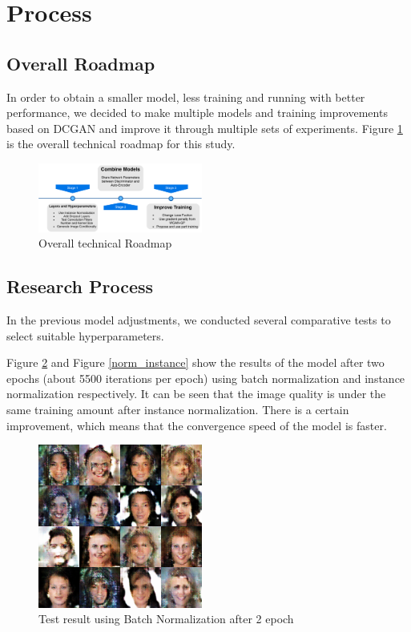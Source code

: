 \section{Process}
\subsection{Overall Roadmap}

In order to obtain a smaller model, less training and running with better performance, we decided to make multiple models and training improvements based on DCGAN and improve it through multiple sets of experiments.
Figure \ref{roadmap} is the overall technical roadmap for this study.

\begin{figure}
    \begin{center}
    \includegraphics[width=0.48\textwidth]{figures/roadmap.pdf}
    \caption{Overall technical Roadmap}
    \label{roadmap}
    \end{center}
\end{figure}


\subsection{Research Process}

In the previous model adjustments, we conducted several comparative tests to select suitable
hyperparameters.

Figure \ref{norm_bach} and Figure \ref{norm_instance} show the results of the model after two epochs (about 5500 iterations per epoch) using batch normalization and instance normalization respectively.
It can be seen that the image quality is under the same training amount after instance normalization.
There is a certain improvement, which means that the convergence speed of the model is faster.

\begin{figure}
    \begin{center}
    \includegraphics[width=0.48\textwidth]{figures/result_norm_batch.png}
    \caption{Test result using Batch Normalization after 2 epoch}
    \label{norm_bach}
    \end{center}
\end{figure}

